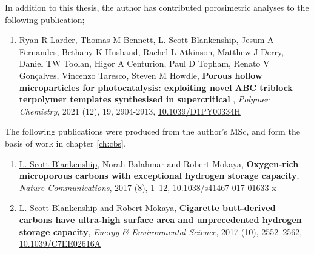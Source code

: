 In addition to this thesis, the author has contributed porosimetric analyses to the following publication;

\begin{enumerate}[resume, label=\Roman*, ref={\textbf{Publication \Roman*}}]
    \item Ryan R Larder, Thomas M Bennett, \underline{L. Scott Blankenship}, Jesum A Fernandes, Bethany K Husband, Rachel L Atkinson, Matthew J Derry, Daniel TW Toolan, Higor A Centurion, Paul D Topham, Renato V Gonçalves, Vincenzo Taresco, Steven M Howdle, \textbf{Porous hollow  microparticles for photocatalysis: exploiting novel ABC triblock terpolymer templates synthesised in supercritical }, \textit{Polymer Chemistry}, 2021 (12), 19, 2904-2913, \href{https://doi.org/10.1039/D1PY00334H}{10.1039/D1PY00334H}
    \label{pub:larder}
    
\end{enumerate}

The following publications were produced from the author's MSc, and form the basis of work in chapter \ref{ch:cbs}.

\begin{enumerate}[resume, label=\Roman*, ref={\textbf{Publication \Roman*}}]
    \item \underline{L. Scott Blankenship}, Norah Balahmar and Robert Mokaya, \textbf{Oxygen-rich microporous carbons with exceptional hydrogen storage capacity}, \textit{Nature Communications}, 2017 (8), 1–12, \href{https://doi.org/10.1038/s41467-017-01633-x}{10.1038/s41467-017-01633-x}
    \label{pub:CA}
    \item \underline{L. Scott Blankenship} and Robert Mokaya, \textbf{Cigarette butt-derived carbons have ultra-high surface area and unprecedented hydrogen storage capacity}, \textit{Energy \& Environmental Science}, 2017 (10), 2552–2562, \href{https://doi.org/10.1039/C7EE02616A}{10.1039/C7EE02616A}
    \label{pub:CB}
    
\end{enumerate}